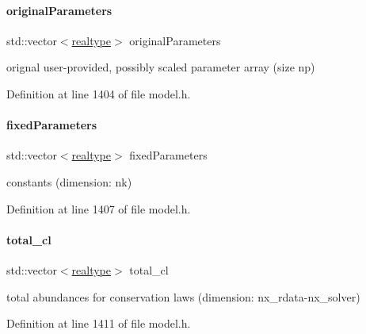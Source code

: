 \paragraph{\texorpdfstring{originalParameters}{originalParameters}}
{\footnotesize\ttfamily std\+::vector$<$\mbox{\hyperlink{namespaceamici_a1bdce28051d6a53868f7ccbf5f2c14a3}{realtype}}$>$ original\+Parameters\hspace{0.3cm}{\ttfamily [protected]}}

orignal user-\/provided, possibly scaled parameter array (size np) 

Definition at line 1404 of file model.\+h.

\mbox{\label{classamici_1_1_model_ac1d5115134ec1c839f1e913724ceb2b4}} 
\paragraph{\texorpdfstring{fixedParameters}{fixedParameters}}
{\footnotesize\ttfamily std\+::vector$<$\mbox{\hyperlink{namespaceamici_a1bdce28051d6a53868f7ccbf5f2c14a3}{realtype}}$>$ fixed\+Parameters\hspace{0.3cm}{\ttfamily [protected]}}

constants (dimension\+: nk) 

Definition at line 1407 of file model.\+h.

\mbox{\label{classamici_1_1_model_a20f20480665b3eea684392186fb87675}} 
\paragraph{\texorpdfstring{total\_cl}{total\_cl}}
{\footnotesize\ttfamily std\+::vector$<$\mbox{\hyperlink{namespaceamici_a1bdce28051d6a53868f7ccbf5f2c14a3}{realtype}}$>$ total\+\_\+cl\hspace{0.3cm}{\ttfamily [protected]}}

total abundances for conservation laws (dimension\+: nx\+\_\+rdata-\/nx\+\_\+solver) 

Definition at line 1411 of file model.\+h.

\mbox{\label{classamici_1_1_model_a103e2e2161a296524543b0bd060fc22a}} 
